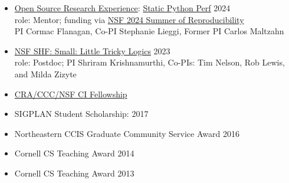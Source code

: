 \documentclass[11pt]{article}
\begin{document}
\begin{itemize}
  \item \href{https://ucsc-ospo.github.io/osre24/}{Open Source Research Experience}: \href{https://ucsc-ospo.github.io/project/osre24/uutah/static-python-perf/}{Static Python Perf} \hfill 2024
    \\ role: Mentor; funding via \href{https://www.nsf.gov/awardsearch/showAward?AWD_ID=2226407&HistoricalAwards=false}{NSF 2024 Summer of Reproducibility}\\
    PI Cormac Flanagan, Co-PI Stephanie Lieggi, Former PI Carlos Maltzahn
  \item \href{https://www.nsf.gov/awardsearch/showAward?AWD_ID=2227863&HistoricalAwards=false}{NSF SHF: Small: Little Tricky Logics} \hfill 2023
    \\ role: Postdoc; PI Shriram Krishnamurthi, Co-PIs: Tim Nelson, Rob Lewis, and Milda Zizyte
  \item \href{https://cifellows2020.org}{CRA/CCC/NSF CI Fellowship} \hfill {}
  \item {SIGPLAN Student Scholarship: \turing{}} \hfill 2017
  \item Northeastern CCIS Graduate Community Service Award \hfill 2016
  \item Cornell CS Teaching Award \hfill 2014
  \item Cornell CS Teaching Award \hfill 2013
\end{itemize}




\end{document}
